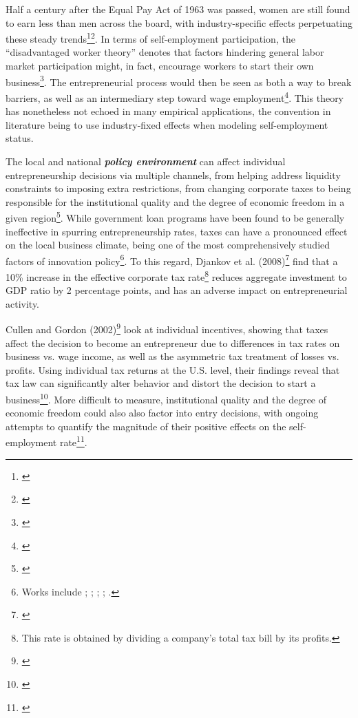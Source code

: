 Half a century after the Equal Pay Act of 1963 was passed, women are still found to earn less than men across the board, with industry-specific effects perpetuating these steady trends\footnote{\cite{corbett2012graduating}}\hspace{.15em}\footnote{\cite{cartwright2011job}}. In terms of self-employment participation, the ``disadvantaged worker theory'' denotes that factors hindering general labor market participation might, in fact, encourage workers to start their own business\footnote{\cite{PatrickStephensWeinstein2016}}. The entrepreneurial process would then be seen as both a way to break barriers, as well as an intermediary step toward wage employment\footnote{\cite{PatrickStephensWeinstein2016}}. This theory has nonetheless not echoed in many empirical applications, the convention in literature being to use industry-fixed effects when modeling self-employment status.

The local and national \textbf{\textit{policy environment}} can affect individual entrepreneurship decisions via multiple channels, from helping address liquidity constraints to imposing extra restrictions, from changing corporate taxes to being responsible for the institutional quality and the degree of economic freedom in a given region\footnote{\cite{Williams2013}}. While government loan programs have been found to be generally ineffective in spurring entrepreneurship rates, taxes can have a pronounced effect on the local business climate, being one of the most comprehensively studied factors of innovation policy\footnote{Works include \cite{CullenGordon2006}; \cite{DjankovGanserMcLieshRamalhoShleifer2008}; \cite{Goetz2008}; \cite{Lerner2009}; \cite{Williams2013}.}. To this regard, Djankov et al. (2008)\footnote{\cite{DjankovGanserMcLieshRamalhoShleifer2008}} find that a 10\% increase in the effective corporate tax rate\footnote{ This rate is obtained by dividing a company's total tax bill by its profits.} reduces aggregate investment to GDP ratio by 2 percentage points, and has an adverse impact on entrepreneurial activity. 

Cullen and Gordon (2002)\footnote{\cite{CullenGordon2002}} look at individual incentives, showing that taxes affect the decision to become an entrepreneur due to differences in tax rates on business vs. wage income, as well as the asymmetric tax treatment of losses vs. profits. Using individual tax returns at the U.S. level, their findings reveal that tax law can significantly alter behavior and distort the decision to start a business\footnote{\cite{CullenGordon2002}}. More difficult to measure, institutional quality and the degree of economic freedom could also also factor into entry decisions, with ongoing attempts to quantify the magnitude of their positive effects on the self-employment rate\footnote{\cite{Williams2013}}.

